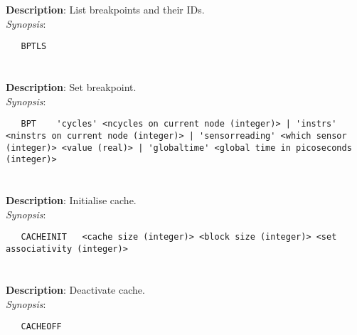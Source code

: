 \section{\quad{}}
\label{manpages:BPTLS}
\label{manpages:bptls}
\vspace{-0.1in}
{\bf Description}: 	List breakpoints and their IDs.\\[1.5ex]
{\em Synopsis}:
\vspace{-0.05in}
\scriptsize
\begin{lstlisting}
   BPTLS   																					
\end{lstlisting}
\normalsize
\vspace{-0.05in}


\section{\quad{}}
\label{manpages:BPT}
\label{manpages:bpt}
\vspace{-0.1in}
{\bf Description}: 	Set breakpoint.\\[1.5ex]
{\em Synopsis}:
\vspace{-0.05in}
\scriptsize
\begin{lstlisting}
   BPT    'cycles' <ncycles on current node (integer)> | 'instrs' <ninstrs on current node (integer)> | 'sensorreading' <which sensor (integer)> <value (real)> | 'globaltime' <global time in picoseconds (integer)>	
\end{lstlisting}
\normalsize
\vspace{-0.05in}


\section{\quad{}}
\label{manpages:CACHEINIT}
\label{manpages:cacheinit}
\vspace{-0.1in}
{\bf Description}: 	Initialise cache.\\[1.5ex]
{\em Synopsis}:
\vspace{-0.05in}
\scriptsize
\begin{lstlisting}
   CACHEINIT   <cache size (integer)> <block size (integer)> <set associativity (integer)>			
\end{lstlisting}
\normalsize
\vspace{-0.05in}


\section{\quad{}}
\label{manpages:CACHEOFF}
\label{manpages:cacheoff}
\vspace{-0.1in}
{\bf Description}: 	Deactivate cache.\\[1.5ex]
{\em Synopsis}:
\vspace{-0.05in}
\scriptsize
\begin{lstlisting}
   CACHEOFF    												
\end{lstlisting}
\normalsize
\vspace{-0.05in}


